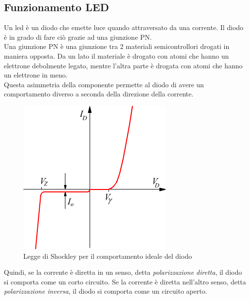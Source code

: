 
\subsection{Funzionamento LED}
Un led è un diodo che emette luce quando attraversato da una corrente. Il diodo è in grado di fare ciò grazie ad una giunzione PN.\\
Una giunzione PN è una giunzione tra 2 materiali semicontrollori drogati in maniera opposta. Da un lato il materiale è drogato con atomi che hanno un elettrone debolmente legato, mentre l'altra parte è drogata con atomi che hanno un elettrone in meno.\\
Questa asimmetria della componente permette al diodo di avere un comportamento diverso a seconda della direzione della corrente.\\ 

\pagebreak
\begin{figure}
    \centering
    \includegraphics[width=\linewidth]{photomultiplier/assets/shokley.png}
    \caption{Legge di Shockley per il comportamento ideale del diodo}
    \label{fig:Photomultiplier}
\end{figure}

Quindi, se la corrente è diretta in un senso, detta \textit{polarizzazione diretta}, il diodo si comporta come un corto circuito. Se la corrente è diretta nell'altro senso, detta \textit{polarizzazione inversa}, il diodo si comporta come un circuito aperto.\\

